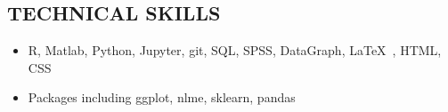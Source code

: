 \documentclass[line,margin,10pt]{res}
\begin{document}
\begin{resume}
  

\section{TECHNICAL SKILLS} 
 \begin{itemize}[leftmargin=-2pt] \itemsep -2pt
\item [] R, Matlab, Python, Jupyter, git, SQL, SPSS, DataGraph, \LaTeX\ , HTML, CSS
\item []Packages including ggplot, nlme, sklearn, pandas
 \end{itemize}


\end{resume}
\end{document}
